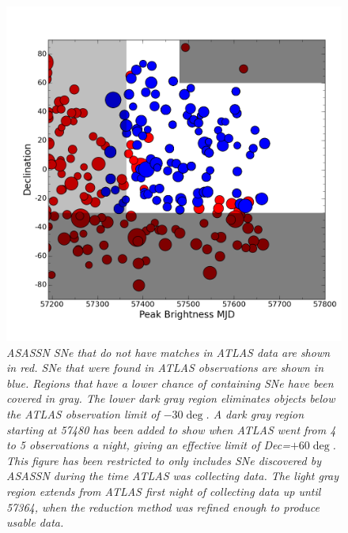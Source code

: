 \begin{figure}[h!]%
\begin{center}
    \includegraphics[width=1\linewidth]{figures/plot2useinPaper_restrictxfurther.png}%
     \caption{\it \small{ASASSN SNe that do not have matches in ATLAS data are shown in red.  SNe that were found in ATLAS observations are shown in blue.  Regions that have a lower chance of containing SNe have been covered in gray.  The lower dark gray region eliminates objects below the ATLAS observation limit of $-30\deg$.  A dark gray region starting at 57480 has been added to show when ATLAS went from 4 to 5 observations a night, giving an effective limit of Dec=$+60\deg$.  This figure has been restricted to only includes SNe discovered by ASASSN during the time ATLAS was collecting data.  The light gray region extends from ATLAS first night of collecting data up until 57364, when the reduction method was refined enough to produce usable data.~\label{fig:dec_mjd}}}
  \end{center}
\end{figure}
